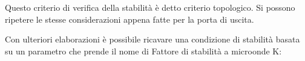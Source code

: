 Questo criterio di verifica della stabilità è detto criterio topologico. Si possono ripetere le stesse considerazioni appena fatte per la porta di uscita.

%	
%	
%	
%	
%	
%	
%	
%	
%	
%	
%	
%	
%	
%	
%	
%	


Con ulteriori elaborazioni è possibile ricavare una condizione di stabilità basata su un parametro che prende il nome di Fattore di stabilità a microonde K:

